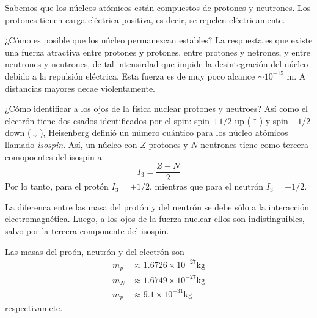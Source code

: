 Sabemos que los núcleos atómicos están compuestos de protones y neutrones. Los protones tienen carga eléctrica positiva, es decir, se repelen eléctricamente.

¿Cómo es posible que los núcleo permanezcan estables? La respuesta es que existe una fuerza atractiva entre protones y protones, entre protones y netrones, y entre neutrones y neutrones, de tal intensirdad que impide la desintegración del núcleo debido a la repulsión eléctrica. Esta fuerza es de muy poco alcance $\sim 10^{-15}$ m. A distancias mayores decae violentamente.

¿Cómo identificar a los ojos de la física nuclear protones y neutroes?
Así como el electrón tiene dos esados identificados por el spin: spin $+1/2$ up ($\uparrow$) y spin $-1/2$ down ($\downarrow$), Heisenberg definió un número cuántico para los núcleo atómicos llamado \textit{isospin}. Así, un núcleo con $Z$ protones y $N$ neutrones tiene como tercera comopoentes del isospin a
\begin{equation}
  I_3=\frac{Z-N}{2}
\end{equation}
Por lo tanto, para el protón $I_3=+1/2$, mientras que para el neutrón $I_3=-1/2$.

La diferenca entre las masa del protón y del neutrón se debe sólo a la interacción electromagnética. Luego, a los ojos de la fuerza nuclear ellos son indistinguibles, salvo por la tercera componente del isospin.

Las masas del proón, neutrón y del electrón son
\begin{align}
  m_p&\approx 1.6726\times 10^{-27} \text{kg}\\
  m_N&\approx 1.6749\times 10^{-27} \text{kg}\\
  m_p&\approx 9.1\times 10^{-31} \text{kg}
\end{align}
respectivamete.











































